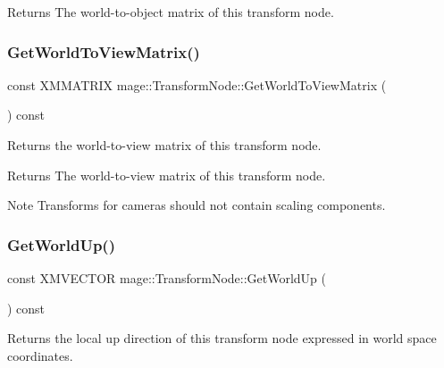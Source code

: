 \begin{DoxyReturn}{Returns}
The world-\/to-\/object matrix of this transform node. 
\end{DoxyReturn}
\hypertarget{structmage_1_1_transform_node_add9f28faa15d91a451880de4743dd439}{}\label{structmage_1_1_transform_node_add9f28faa15d91a451880de4743dd439} 
\subsubsection{\texorpdfstring{Get\+World\+To\+View\+Matrix()}{GetWorldToViewMatrix()}}
{\footnotesize\ttfamily const X\+M\+M\+A\+T\+R\+IX mage\+::\+Transform\+Node\+::\+Get\+World\+To\+View\+Matrix (\begin{DoxyParamCaption}{ }\end{DoxyParamCaption}) const\hspace{0.3cm}{\ttfamily [noexcept]}}

Returns the world-\/to-\/view matrix of this transform node.

\begin{DoxyReturn}{Returns}
The world-\/to-\/view matrix of this transform node. 
\end{DoxyReturn}
\begin{DoxyNote}{Note}
Transforms for cameras should not contain scaling components. 
\end{DoxyNote}
\hypertarget{structmage_1_1_transform_node_a9d545f02c9d8062a29b236a94c8c2136}{}\label{structmage_1_1_transform_node_a9d545f02c9d8062a29b236a94c8c2136} 
\subsubsection{\texorpdfstring{Get\+World\+Up()}{GetWorldUp()}}
{\footnotesize\ttfamily const X\+M\+V\+E\+C\+T\+OR mage\+::\+Transform\+Node\+::\+Get\+World\+Up (\begin{DoxyParamCaption}{ }\end{DoxyParamCaption}) const\hspace{0.3cm}{\ttfamily [noexcept]}}

Returns the local up direction of this transform node expressed in world space coordinates.

